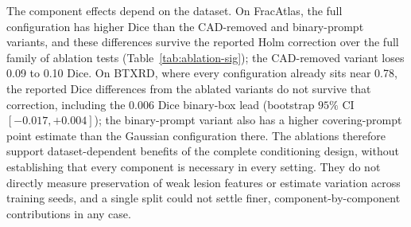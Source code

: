 \begin{table}[t]
\caption{Paired comparison of the full model against each ablated variant, per-image Dice on the single split. The Delta column is the mean per-image Dice difference (full minus variant), tested with a two-sided paired sign-flip randomization test ($20{,}000$ permutations). $^{**}$ marks entries that stay significant ($p<0.05$) after Holm correction over the full family of ablation tests (four ablated model contrasts $\times$ two datasets $\times$ two prompt conditions, all on Dice, the only metric tested here); $^{*}$ marks raw $p<0.05$ that does not survive correction.}
\label{tab:ablation-sig}
\centering
\scriptsize
{}
\end{table}

The component effects depend on the dataset. On FracAtlas, the full configuration has higher Dice than the CAD-removed and binary-prompt variants, and these differences survive the reported Holm correction over the full family of ablation tests (Table~\ref{tab:ablation-sig}); the CAD-removed variant loses 0.09 to 0.10 Dice. On BTXRD, where every configuration already sits near 0.78, the reported Dice differences from the ablated variants do not survive that correction, including the 0.006 Dice binary-box lead (bootstrap $95\%$ CI $[-0.017, +0.004]$); the binary-prompt variant also has a higher covering-prompt point estimate than the Gaussian configuration there. The ablations therefore support dataset-dependent benefits of the complete conditioning design, without establishing that every component is necessary in every setting. They do not directly measure preservation of weak lesion features or estimate variation across training seeds, and a single split could not settle finer, component-by-component contributions in any case.

